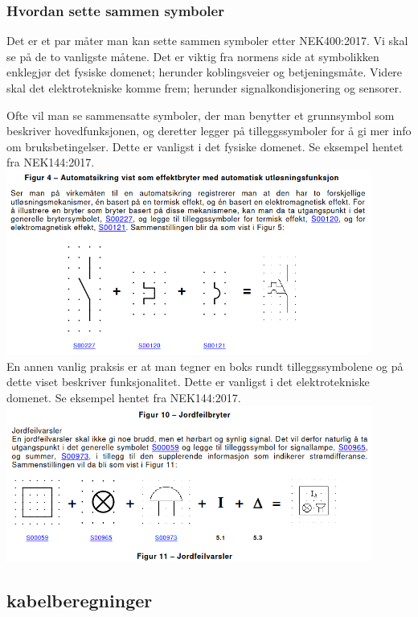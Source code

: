 \documentclass{article}
\begin{document}
\subsubsection*{Hvordan sette sammen symboler}
Det er et par måter man kan sette sammen symboler etter NEK400:2017. Vi skal se på de to vanligste måtene. Det er viktig fra normens side at symbolikken enklegjør det fysiske domenet; herunder koblingsveier og betjeningsmåte. Videre skal det elektrotekniske komme frem; herunder signalkondisjonering og sensorer.

Ofte vil man se sammensatte symboler, der man benytter et grunnsymbol som beskriver hovedfunksjonen, og deretter legger på tilleggssymboler for å gi mer info om bruksbetingelser. Dette er vanligst i det fysiske domenet. Se eksempel hentet fra NEK144:2017.\\
\includegraphics[width=0.9\textwidth]{bilder/eksempel 1 symbolsammensetning.png}\\

En annen vanlig praksis er at man tegner en boks rundt tilleggssymbolene og på dette viset beskriver funksjonalitet. Dette er vanligst i det elektrotekniske domenet. Se eksempel hentet fra NEK144:2017.\\
\includegraphics[width=0.9\textwidth]{bilder/eksempel 2 symbolsammensetning.png}\\

\subsection*{kabelberegninger}
\end{document}
